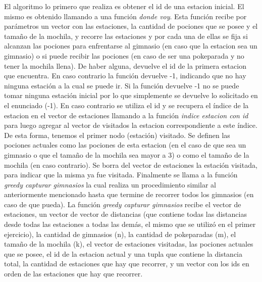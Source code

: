             El algoritmo lo primero que realiza es obtener el id de una estacion inicial. El mismo es obtenido llamando a una función \textit{donde voy}. Esta función recibe por parámetros un vector con las estaciones, la cantidad de pociones que se posee y el tamaño de la mochila, y recorre las estaciones y por cada una de ellas se fija si alcanzan las pociones para enfrentarse al gimnasio (en caso que la estacion sea un gimnasio) o si puede recibir las pociones (en caso de ser una pokeparada y no tener la mochila llena). De haber alguna, devuelve el id de la primera estacion que encuentra. En caso contrario la función devuelve -1, indicando que no hay ninguna estación a la cual se puede ir. Si la función devuelve -1 no se puede tomar ninguna estación inicial por lo que simplemente se devuelve lo solicitado en el enunciado (-1). En caso contrario se utiliza el id y se recupera el índice de la estacion en el vector de estaciones llamando a la función \textit{indice estacion con id} para luego agregar al vector de visitados la estacion correspondiente a este índice. De esta forma, tenemos el primer nodo (estación) visitado. Se definen las pociones actuales como las pociones de esta estacion (en el caso de que sea un gimnasio o que el tamaño de la mochila sea mayor a 3) o como el tamaño de la mochila (en caso contrario). Se borra del vector de estaciones la estación visitada, para indicar que la misma ya fue visitada. Finalmente se llama a la función \textit{greedy capturar gimnasios} la cual realiza un procedimiento similar al anteriormente mencionado hasta que termine de recorrer todos los gimnasios (en caso de que pueda). La función \textit{greedy capturar gimnasios} recibe el vector de estaciones, un vector de vector de distancias (que contiene todas las distancias desde todas las estaciones a todas las demás, el mismo que se utilizó en el primer ejercicio), la cantidad de gimnasios (n), la cantidad de pokeparadas (m), el tamaño de la mochila (k), el vector de estaciones visitadas, las pociones actuales que se posee, el id de la estacion actual y una tupla que contiene la distancia total, la cantidad de estaciones que hay que recorrer, y un vector con los ids en orden de las estaciones que hay que recorrer.
